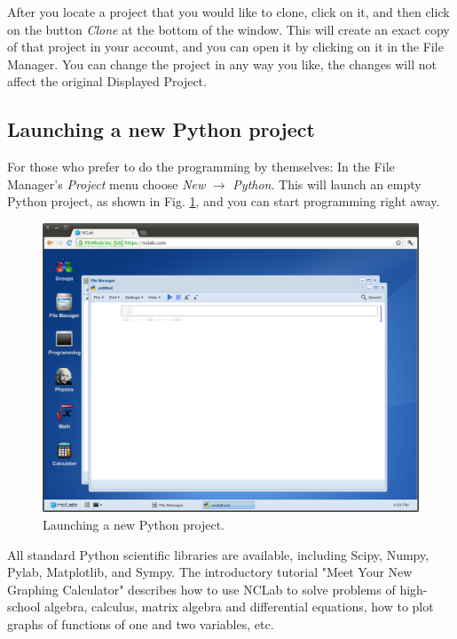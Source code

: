 \documentclass{article}
\begin{document}
After you locate a project that you would like to clone, click on it,
and then click on the button {\em Clone} at the bottom of the window. This will
create an exact copy of that project in your account, and you can open it 
by clicking on it in the File Manager. You can change the project in any way 
you like, the changes will not affect the original Displayed Project. 


\subsection{Launching a new Python project}

For those who prefer to do the programming by themselves: 
In the File Manager's {\em Project} menu 
choose {\em New} $\rightarrow$ {\em Python}. This will launch an 
empty Python project, as shown in Fig. \ref{fig:python}, and you can start 
programming right away. 

\begin{figure}[!ht]
\begin{center}
\includegraphics[width=\textwidth]{img/python.png}
\end{center}
\caption{Launching a new Python project.}
\label{fig:python}
\end{figure}
\noindent
All standard Python scientific  libraries are 
available, including Scipy, Numpy, Pylab, Matplotlib, and Sympy. 
The introductory tutorial "Meet Your New Graphing Calculator"
describes how to use NCLab to solve problems of high-school algebra,
calculus, matrix algebra and differential equations, how to 
plot graphs of functions of one and two variables, etc. 
\end{document}
